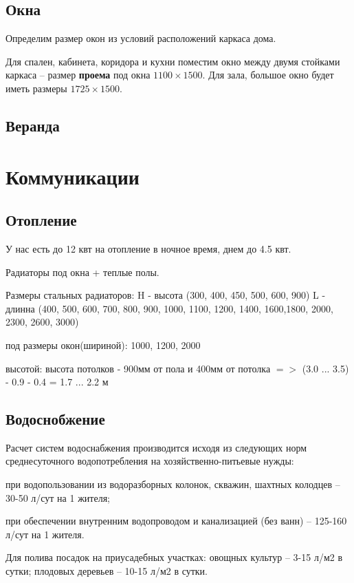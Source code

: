 \documentclass[10pt, twocolumn]{report}
\newenvironment{itemize*}%
{\begin{itemize}%
	\setlength{\itemsep}{1pt}%
	\setlength{\parskip}{1pt}}%
{\end{itemize}}
\begin{document}
\chapter{Окна}

Определим размер окон из условий расположений каркаса дома.

Для спален, кабинета, коридора и кухни поместим окно между двумя стойками каркаса -- размер \textbf{проема} под окна $1100 \times 1500$. Для зала, большое окно будет иметь размеры $1725 \times 1500$. 

\chapter{Веранда}

\part{Коммуникации}

\chapter{Отопление}
У нас есть до 12 квт на отопление в ночное время, днем до 4.5 квт.

Радиаторы под окна + теплые полы.

Размеры стальных радиаторов:
H - высота (300, 400, 450, 500, 600, 900)
L - длинна (400, 500, 600, 700, 800, 900, 1000, 1100, 1200, 1400, 1600,1800, 2000, 2300, 2600, 3000)

под размеры окон(шириной): 1000, 1200, 2000

высотой: высота потолков - 900мм от пола и 400мм от потолка $=>$ (3.0 ... 3.5) - 0.9 - 0.4 = 1.7 ... 2.2 м

\chapter{Водоснобжение}
Расчет систем водоснабжения производится исходя из следующих норм среднесуточного водопотребления на хозяйственно-питьевые нужды:

\begin{itemize*}
	\item при водопользовании из водоразборных колонок, скважин, шахтных колодцев -- 30-50 л/сут на 1 жителя;
	\item при обеспечении внутренним водопроводом и канализацией (без ванн) -- 125-160 л/сут на 1 жителя.
	\item Для полива посадок на приусадебных участках: овощных культур -- 3-15 л/м2 в сутки; плодовых деревьев -- 10-15 л/м2 в сутки.
\end{itemize*}
\end{document}
